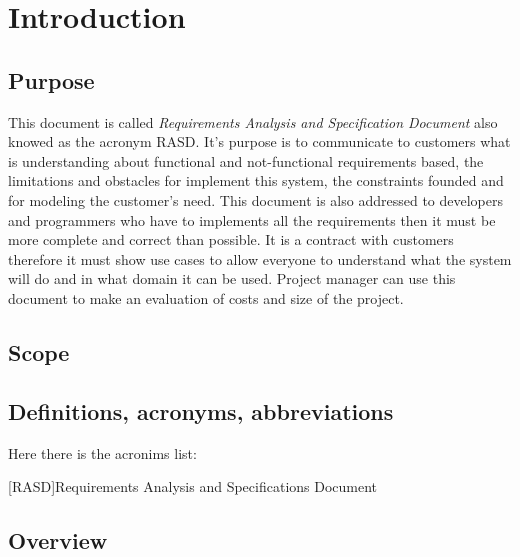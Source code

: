 \section{Introduction} \label{sec:intro}

\subsection{Purpose} \label{subsec:purpose}
This document is called \emph{Requirements Analysis and Specification Document} also knowed as the acronym RASD. It's purpose is to communicate to customers what is understanding about functional and not-functional requirements based, the limitations and obstacles for implement this system, the constraints founded and for modeling the customer's need. This document is also addressed to developers and programmers who have to implements all the requirements then it must be more complete and correct than possible. It is a contract with customers therefore it must show use cases to allow everyone to understand what the system will do and in what domain it can be used. Project manager can use this document to make an evaluation of costs and size of the project.


\subsection{Scope} \label{subsec:scope}


\subsection{Definitions, acronyms, abbreviations} \label{subsec:def}

Here there is the acronims list:

\begin{acronym}[RASD] %

[RASD]{Requirements Analysis and Specifications Document}

\end{acronym}


\subsection{Overview} \label{subsec:overview}


